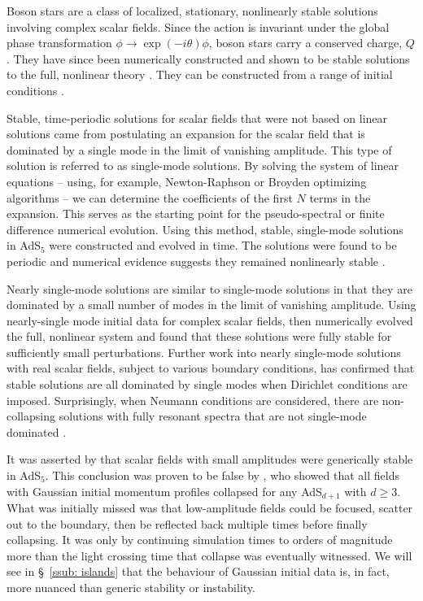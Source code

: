 \documentclass[../PhD.tex]{subfiles}
\begin{document}
Boson stars are a class of localized, stationary, nonlinearly stable solutions involving complex scalar fields. Since the \ads action is invariant under the global phase transformation $\phi \to \exp(-i \theta) \phi$, boson stars carry a conserved charge, $Q$. They have since been numerically constructed and shown to be stable solutions to the full, nonlinear theory \cite{1304.4166}. They can be constructed from a range of initial conditions \cite{1209.2378, 1301.2452}. 

Stable, time-periodic solutions for scalar fields that were not based on linear solutions came from postulating an expansion for the scalar field that is dominated by a single mode in the limit of vanishing amplitude. This type of solution is referred to as single-mode solutions. By solving the system of linear equations -- using, for example, Newton-Raphson or Broyden optimizing algorithms -- we can determine the coefficients of the first $N$ terms in the expansion. This serves as the starting point for the pseudo-spectral or finite difference numerical evolution. Using this method, stable, single-mode solutions in AdS$_5$ were constructed and evolved in time. The solutions were found to be periodic and numerical evidence suggests they remained nonlinearly stable \cite{1303.3186}.

Nearly single-mode solutions are similar to single-mode solutions in that they are dominated by a small number of modes in the limit of vanishing amplitude. Using nearly-single mode initial data for complex scalar fields, \cite{1304.4166} then numerically evolved the full, nonlinear system and found that these solutions were fully stable for sufficiently small perturbations. Further work into nearly single-mode solutions with real scalar fields, subject to various boundary conditions, has confirmed that stable solutions are all dominated by single modes when Dirichlet conditions are imposed. Surprisingly, when Neumann conditions are considered, there are non-collapsing solutions with fully resonant spectra that are not single-mode dominated \cite{1908.02296}.


It was asserted by \cite{1106.2339} that scalar fields with small amplitudes were generically stable in AdS$_5$. This conclusion was proven to be false by \cite{1108.4539}, who showed that all fields with Gaussian initial momentum profiles collapsed for any AdS$_{d+1}$ with $d \geq 3$. What was initially missed was that low-amplitude fields could be focused, scatter out to the boundary, then be reflected back multiple times before finally collapsing. It was only by continuing simulation times to orders of magnitude more than the light crossing time that collapse was eventually witnessed. We will see in \S~\!\ref{ssub: islands} that the behaviour of Gaussian initial data is, in fact, more nuanced than generic stability or instability.
\end{document}
